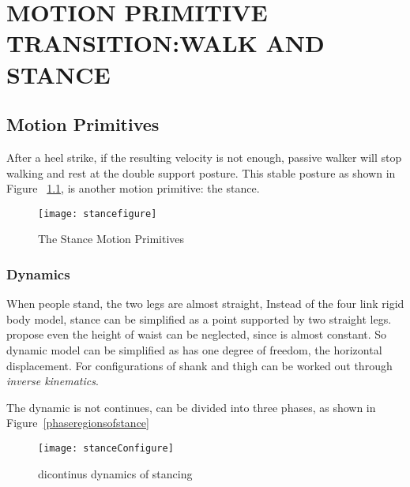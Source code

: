 
\chapter{MOTION PRIMITIVE TRANSITION:WALK AND STANCE}
\label{chap:stance}
    \graphicspath{{WalkStance/WalkStanceFigs/EPS/}{WalkStance/WalkStanceFigs/}}




\section{Motion Primitives}
After a  heel strike, if the resulting velocity is not enough, passive walker will stop walking and rest at the double support posture.
This stable posture as shown in Figure ~\ref{fig:bipedalstance}, is another motion primitive: the stance. 



\begin{figure}[!htbp]
  \begin{center}
      \texttt{[image: stancefigure]}
    \caption{The Stance Motion Primitives}
    \label{fig:bipedalstance}
\end{center}
\end{figure}


\subsection{Dynamics}
When people stand, the two legs are almost straight, 
Instead of the four link rigid body model, stance can be simplified as a point supported by two straight legs. 
\citet{stephens2009modeling} propose even the height of waist can be neglected, since is almost constant.
So dynamic model can be simplified as has one degree of freedom, the horizontal displacement.
For configurations of shank and thigh can be worked out through \emph{inverse kinematics}.
 




The dynamic is not continues, can be divided into three phases, as shown in Figure~\ref{phaseregionsofstance}

\begin{figure}[!htbp]
  \begin{center}
     \texttt{[image: stanceConfigure]}
    \caption{dicontinus dynamics of stancing}
    \label{fig:phaseregionsofstance}
\end{center}
\end{figure}


